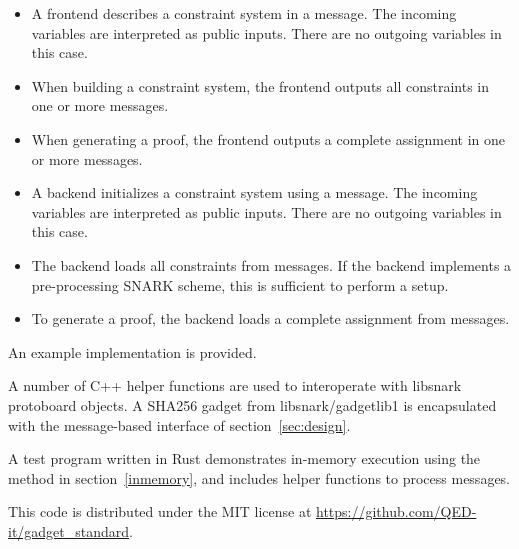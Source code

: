 \begin{itemize}
    \item A frontend describes a constraint system in a  message. The incoming variables are interpreted as public inputs. There are no outgoing variables in this case.

    \item When building a constraint system, the frontend outputs all constraints in one or more  messages.

    \item When generating a proof, the frontend outputs a complete assignment in one or more  messages.
\end{itemize}


\begin{itemize}
    \item A backend initializes a constraint system using a  message. The incoming variables are interpreted as public inputs. There are no outgoing variables in this case.

    \item The backend loads all constraints from  messages. If the backend implements a pre-processing SNARK scheme, this is sufficient to perform a setup.

    \item To generate a proof, the backend loads a complete assignment from  messages.
\end{itemize}



An example implementation is provided.

A number of C++ helper functions are used to interoperate
with libsnark protoboard objects.
A SHA256 gadget from libsnark/gadgetlib1
is encapsulated with the message-based interface of section~\ref{sec:design}.

A test program written in Rust demonstrates
in-memory execution using the method in section~\ref{inmemory},
and includes helper functions to process messages.

This code is distributed under the MIT license at
\href{https://github.com/QED-it/gadget_standard}{https://github.com/QED-it/gadget\_standard}.

